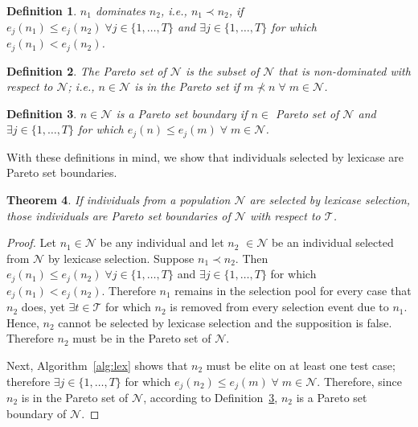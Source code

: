 \documentclass[twoside]{article}
\newtheorem{lex}{Theorem}[section]
\newtheorem{defn}[lex]{Definition}
\begin{document}
\begin{defn}\label{def:dom}
$n_1$ {\it dominates} $n_2$, i.e., ${n_1} \prec {n_2}$, if $e_j(n_1) \leq e_j(n_2) \;
\forall j  \in \{1,\dots,T\}$ and $\exists j \in \{1,\dots,T\}$ for which $e_j(n_1) < e_j(n_2)$. \bigskip
\end{defn}

\begin{defn}\label{def:pset}
The {\it Pareto set} of $\mathcal{N}$ is the subset of $\mathcal{N}$ that is non-dominated with respect to $\mathcal{N}$; i.e., $n \in \mathcal{N}$ is in the Pareto set if $m \nprec n \; \forall \; m \in \mathcal{N}$. 
\end{defn}

\begin{defn}\label{def:boundary}
$n \in \mathcal{N}$ is a {\it Pareto set boundary} if $n \in$ Pareto set of $\mathcal{N}$ and $\exists j \in \{1,\dots,T\}$ for which $e_j(n) \leq e_j(m) \; \forall \; m \in \mathcal{N}$. 
\end{defn}

With these definitions in mind, we show that individuals selected by lexicase are Pareto set boundaries. 

\begin{lex}\label{thm:lex}
If individuals from a population $\mathcal{N}$ are selected by lexicase selection, those individuals are Pareto set boundaries of $\mathcal{N}$ with respect to $\mathcal{T}$. 
\end{lex}

\begin{proof}
Let $n_1 \in \mathcal{N}$ be any individual and let $n_2$ $\in \mathcal{N}$ be an individual selected from $\mathcal{N}$ by lexicase selection. Suppose $n_1 \prec n_2$. Then $e_j(n_1) \leq e_j(n_2) \;
\forall j  \in \{1,\dots,T\}$ and $\exists j \in \{1,\dots,T\}$ for which $e_j(n_1) < e_j(n_2)$. Therefore $n_1$ remains in the selection pool for every case that $n_2$ does, yet $\exists t \in \mathcal{T}$ for which $n_2$ is removed from every selection event due to $n_1$. Hence, $n_2$ cannot be selected by lexicase selection and the supposition is false. Therefore $n_2$ must be in the Pareto set of $\mathcal{N}$. 

Next, Algorithm~\ref{alg:lex} shows that $n_2$ must be elite on at least one test case; therefore $\exists j \in \{1,\dots,T\}$ for which $e_j(n_2) \leq e_j(m) \; \forall \; m \in \mathcal{N}$. Therefore, since $n_2$ is in the Pareto set of $\mathcal{N}$, according to Definition~\ref{def:boundary}, $n_2$ is a Pareto set boundary of $\mathcal{N}$.  
\end{proof}
\bigskip
\end{document}
